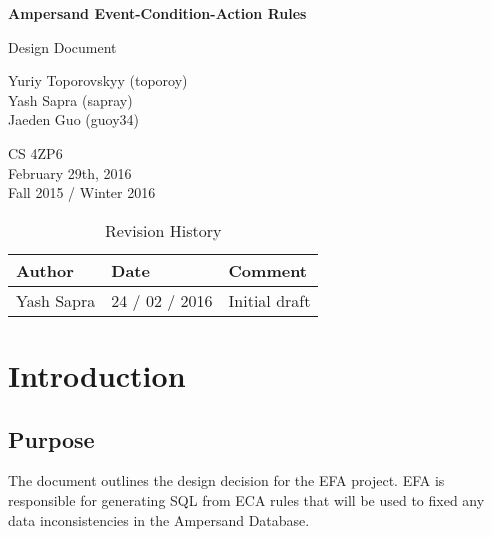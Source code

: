 \documentclass[12pt]{report}
\begin{document}
\begin{titlepage}\begin{center}
\thispagestyle{empty} %

\vspace*{1cm}

{\Huge\textbf{Ampersand Event-Condition-Action Rules}}

\vspace{0.5cm}
{\Large Design Document
	

\vspace{1.5cm}
Yuriy Toporovskyy (toporoy) \\ Yash Sapra (sapray) \\ Jaeden Guo (guoy34)}
\vfill


\vspace{0.8cm}
\end{center}
CS 4ZP6 \\
February 29th, 2016 \\ 
Fall 2015 / Winter 2016 
\end{titlepage}


\begin{table}[ht!]\begin{center}
\caption{Revision History}  
\begin{tabular}{|l|l|l|}\hline
\textbf{Author} & \textbf{Date} & \textbf{Comment} \\\hline 
Yash Sapra & 24 / 02 / 2016 & Initial draft\\\hline
\end{tabular}
\end{center}\end{table}

\newpage

\tableofcontents
\listoffigures
\listoftables

\newpage
{} %

\chapter{Introduction}\label{ch:Introduction}

\section{Purpose}\label{sec:Purpose}
The document outlines the design decision for the EFA project. 
EFA is responsible for generating SQL from ECA rules that will 
be used to fixed any data inconsistencies in the Ampersand Database.
\end{document}
